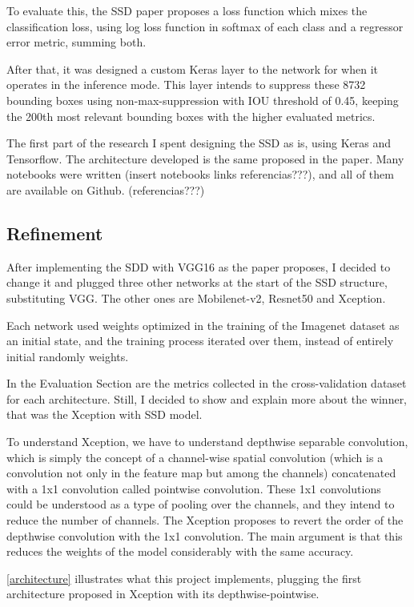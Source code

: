 \documentclass[11pt, a4paper, twocolumn]{article}
\begin{document}
To evaluate this, the SSD paper proposes a loss function which mixes the classification loss, using log loss function in softmax of each class and a regressor error metric, summing both.

After that, it was designed a custom Keras layer to the network for when it operates in the inference mode. This layer intends to suppress these 8732 bounding boxes using non-max-suppression with IOU threshold of 0.45, keeping the 200th most relevant bounding boxes with the higher evaluated metrics.

The first part of the research I spent designing the SSD as is, using Keras and Tensorflow. The architecture developed is the same proposed in the paper. Many notebooks were written (insert notebooks links referencias???), and all of them are available on Github. (referencias???)

\subsection{Refinement}

After implementing the SDD with VGG16 as the paper proposes, I decided to change it and plugged three other networks at the start of the SSD structure, substituting VGG. The other ones are Mobilenet-v2, Resnet50 and Xception.

Each network used weights optimized in the training of the Imagenet dataset as an initial state, and the training process iterated over them, instead of entirely initial randomly weights.

In the Evaluation Section are the metrics collected in the cross-validation dataset for each architecture. Still, I decided to show and explain more about the winner, that was the Xception with SSD model.

To understand Xception, we have to understand depthwise separable convolution, which is simply the concept of a channel-wise spatial convolution (which is a convolution not only in the feature map but among the channels) concatenated with a 1x1 convolution called pointwise convolution. These 1x1 convolutions could be understood as a type of pooling over the channels, and they intend to reduce the number of channels. The Xception proposes to revert the order of the depthwise convolution with the 1x1 convolution. The main argument is that this reduces the weights of the model considerably with the same accuracy.

\ref{architecture} illustrates what this project implements, plugging the first architecture proposed in Xception with its depthwise-pointwise.
\end{document}
